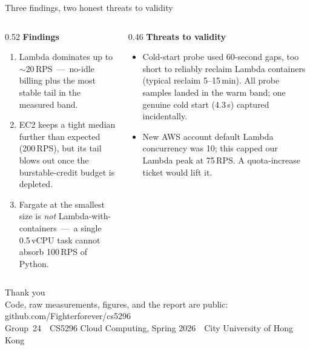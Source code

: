 \documentclass[aspectratio=169,11pt]{beamer}
\begin{document}
\begin{frame}{Three findings, two honest threats to validity}
  \begin{columns}[T]
    \begin{column}{0.52\linewidth}
      \textbf{Findings}\\[2pt]
      \begin{enumerate}[1.]\setlength\itemsep{4pt}
        \item Lambda dominates up to \(\sim\)20\,RPS \,—\, no-idle billing plus the most stable tail in the measured band.
        \item EC2 keeps a tight median further than expected (200\,RPS), but its tail blows out once the burstable-credit budget is depleted.
        \item Fargate at the smallest size is \emph{not} Lambda-with-containers \,—\, a single 0.5\,vCPU task cannot absorb 100\,RPS of Python.
      \end{enumerate}
    \end{column}
    \begin{column}{0.46\linewidth}
      \textbf{Threats to validity}\\[2pt]
      \begin{itemize}\setlength\itemsep{4pt}
        \item Cold-start probe used 60-second gaps, too short to reliably reclaim Lambda containers (typical reclaim 5--15\,min). All probe samples landed in the warm band; one genuine cold start (4.3\,s) captured incidentally.
        \item New AWS account default Lambda concurrency was 10; this capped our Lambda peak at 75\,RPS. A quota-increase ticket would lift it.
      \end{itemize}
    \end{column}
  \end{columns}
\end{frame}

\begin{frame}[plain]
  \vfill
  \begin{center}
    {Thank you}\\[18pt]

    {\large Code, raw measurements, figures, and the report are public:}\\[8pt]
    {\large\ttfamily github.com/Fighterforever/cs5296}\\[26pt]

    \footnotesize\textcolor{black!60}{Group~24 \,\textbar\, CS5296 Cloud Computing, Spring 2026 \,\textbar\, City University of Hong Kong}
  \end{center}
  \vfill
\end{frame}
\end{document}
